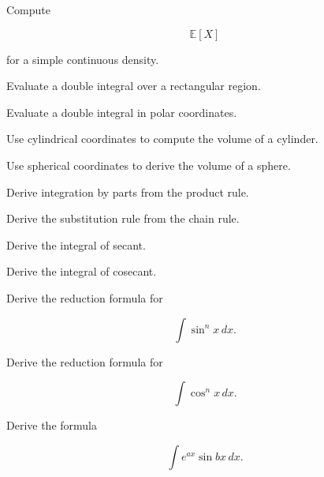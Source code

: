 \begin{exercise}[3]
Compute

\[
\mathbb{E}[X]
\]

for a simple continuous density.
\end{exercise}

\begin{exercise}[3]
Evaluate a double integral over a rectangular region.
\end{exercise}

\begin{exercise}[3]
Evaluate a double integral in polar coordinates.
\end{exercise}

\begin{exercise}[3]
Use cylindrical coordinates to compute the volume of a cylinder.
\end{exercise}

\begin{exercise}[3]
Use spherical coordinates to derive the volume of a sphere.
\end{exercise}

\begin{exercise}[4]
Derive integration by parts from the product rule.
\end{exercise}

\begin{exercise}[4]
Derive the substitution rule from the chain rule.
\end{exercise}

\begin{exercise}[4]
Derive the integral of secant.
\end{exercise}

\begin{exercise}[4]
Derive the integral of cosecant.
\end{exercise}

\begin{exercise}[4]
Derive the reduction formula for

\[
\int\sin^n x\,dx.
\]
\end{exercise}

\begin{exercise}[4]
Derive the reduction formula for

\[
\int\cos^n x\,dx.
\]
\end{exercise}

\begin{exercise}[4]
Derive the formula

\[
\int
e^{ax}\sin bx
\,dx.
\]
\end{exercise}

